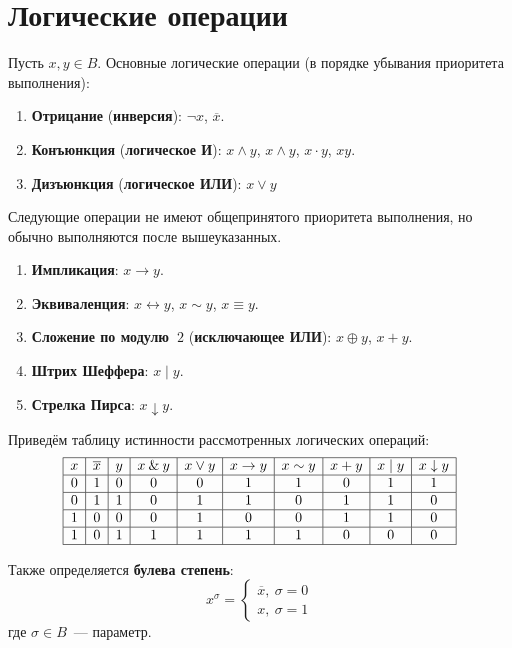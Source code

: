 \section{Логические операции}
Пусть $x, y \in B$.
 Основные логические операции (в порядке убывания приоритета выполнения):
\begin{enumerate}
	\item {}  \textbf{Отрицание} (\textbf{инверсия}): $\lnot x$, $\overline x$.
	\item {} \textbf{Конъюнкция} (\textbf{логическое И}): $x \land y$, $x \wedge y$, $x \cdot y$, $xy$.
	\item {} \textbf{Дизъюнкция} (\textbf{логическое ИЛИ}): $x \lor y$
\end{enumerate}

Следующие операции не имеют общепринятого приоритета выполнения, но обычно выполняются после вышеуказанных.
\begin{enumerate}
	\item \textbf{Импликация}: $x \rightarrow y$.
	\item \textbf{Эквиваленция}: $x \leftrightarrow y$, $x \sim y$, $x \equiv y$.
	\item \textbf{Сложение по модулю~$2$} (\textbf{исключающее ИЛИ}): $x \oplus y$, $x + y$.
	\item \textbf{Штрих Шеффера}: $x \mid y$.
	\item \textbf{Стрелка Пирса}: $x \downarrow y$.
\end{enumerate}

Приведём таблицу истинности рассмотренных логических операций:
\begin{equation*}
\begin{array}{|c|c|c|c|c|c|c|c|c|c|}
\hline
x & \overline x & y & x \land y & x \lor y & x \rightarrow y & x \sim y & x + y & x \mid y & x \downarrow y \\
\hline
0 & 1 & 0 & 0 & 0 & 1 & 1 & 0 & 1 & 1 \\
\hline
0 & 1 & 1 & 0 & 1 & 1 & 0 & 1 & 1 & 0 \\
\hline
1 & 0 & 0 & 0 & 1 & 0 & 0 & 1 & 1 & 0 \\
\hline
1 & 0 & 1 & 1 & 1 & 1 & 1 & 0 & 0 & 0 \\
\hline
\end{array}
\end{equation*}

 Также определяется \textbf{булева степень}:
\begin{equation*}
x^\sigma =
\begin{cases}
\overline x, \ \sigma = 0 \\
x, \ \sigma = 1
\end{cases}
\end{equation*}
где $\sigma \in B$~--- параметр.